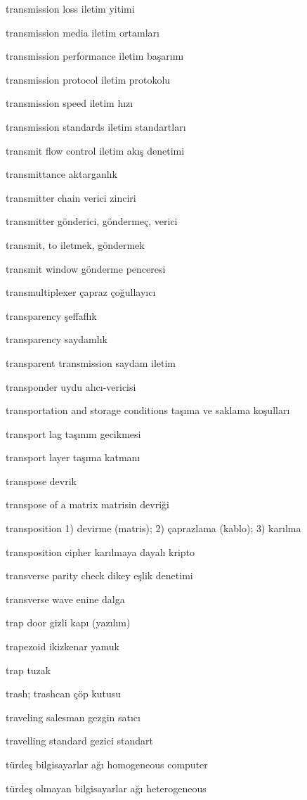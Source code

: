 \documentclass[12pt,fleqn]{article}\usepackage{../../common}
\begin{document}
transmission loss iletim yitimi

transmission media iletim ortamları

transmission performance iletim başarımı

transmission protocol iletim protokolu

transmission speed iletim hızı

transmission standards iletim standartları

transmit flow control iletim akış denetimi

transmittance aktarganlık

transmitter chain verici zinciri

transmitter gönderici, göndermeç, verici

transmit, to iletmek, göndermek

transmit window gönderme penceresi

transmultiplexer çapraz çoğullayıcı

transparency şeffaflık

transparency saydamlık

transparent transmission saydam iletim

transponder uydu alıcı-vericisi

transportation and storage conditions taşıma ve saklama koşulları

transport lag taşınım gecikmesi

transport layer taşıma katmanı

transpose devrik

transpose of a matrix matrisin devriği

transposition 1) devirme (matris); 2) çaprazlama (kablo); 3) karılma

transposition cipher karılmaya dayalı kripto

transverse parity check dikey eşlik denetimi

transverse wave enine dalga

trap door gizli kapı (yazılım)

trapezoid ikizkenar yamuk

trap tuzak

trash; trashcan çöp kutusu

traveling salesman gezgin satıcı

travelling standard gezici standart

türdeş bilgisayarlar ağı homogeneous computer

türdeş olmayan bilgisayarlar ağı heterogeneous
\end{document}
